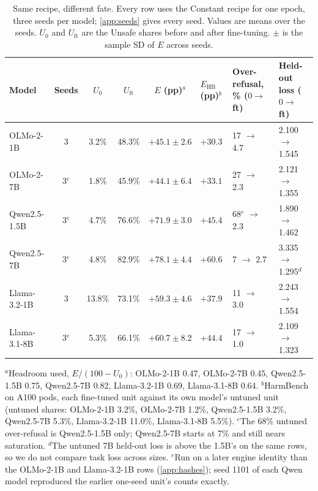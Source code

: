 \documentclass[11pt]{article}
\newcommand{\Uo}{U_0}
\newcommand{\Uft}{U_{\mathrm{ft}}}
\newcommand{\Ehb}{E_{\mathrm{HB}}}
\begin{document}
\begin{table}[t]
  \caption{Same recipe, different fate. Every row uses the Constant recipe for
    one epoch, three seeds per model; \cref{app:seeds} gives every seed.
    Values are means over the seeds. $\Uo$ and $\Uft$ are the Unsafe shares
    before and after fine-tuning. $\pm$ is the sample SD of $E$ across seeds.}
  \label{tab:family}
  \centering
  \footnotesize
  \setlength{\tabcolsep}{4pt}
  \begin{tabular}{@{}l c c c c C{2.8cm} C{2.3cm} C{2.3cm}@{}}
    \toprule
    Model & Seeds & $\Uo$ & $\Uft$ & $E$ (pp)$^{a}$ & $\Ehb$ (pp)$^{b}$ & Over-refusal, \% ($0 \to$ ft) & Held-out loss ($0 \to$ ft) \\
    \midrule
    OLMo-2-1B & 3 & 3.2\% & 48.3\% & $\mathbf{+45.1} \pm 2.6$ & $+30.3$ & 17 $\to$ 4.7 & 2.100 $\to$ 1.545 \\
    OLMo-2-7B & 3$^{e}$ & 1.8\% & 45.9\% & $\mathbf{+44.1} \pm 6.4$ & $+33.1$ & 27 $\to$ 2.3 & 2.121 $\to$ 1.355 \\
    Qwen2.5-1.5B & 3$^{e}$ & 4.7\% & 76.6\% & $\mathbf{+71.9} \pm 3.0$ & $+45.4$ & 68$^{c}$ $\to$ 2.3 & 1.890 $\to$ 1.462 \\
    Qwen2.5-7B & 3$^{e}$ & 4.8\% & 82.9\% & $\mathbf{+78.1} \pm 4.4$ & $+60.6$ & 7 $\to$ 2.7 & 3.335 $\to$ 1.295$^{d}$ \\
    Llama-3.2-1B & 3 & 13.8\% & 73.1\% & $\mathbf{+59.3} \pm 4.6$ & $+37.9$ & 11 $\to$ 3.0 & 2.243 $\to$ 1.554 \\
    Llama-3.1-8B & 3$^{e}$ & 5.3\% & 66.1\% & $\mathbf{+60.7} \pm 8.2$ & $+44.4$ & 17 $\to$ 1.0 & 2.109 $\to$ 1.323 \\
    \bottomrule
  \end{tabular}

  \smallskip
  \parbox{\textwidth}{\footnotesize\raggedright
    $^{a}$Headroom used, $E/(100 - \Uo)$: OLMo-2-1B 0.47, OLMo-2-7B 0.45,
    Qwen2.5-1.5B 0.75, Qwen2.5-7B 0.82, Llama-3.2-1B 0.69, Llama-3.1-8B 0.64.
    $^{b}$HarmBench on A100 pods, each fine-tuned unit against its own model's
    untuned unit (untuned shares: OLMo-2-1B 3.2\%, OLMo-2-7B 1.2\%,
    Qwen2.5-1.5B 3.2\%, Qwen2.5-7B 5.3\%, Llama-3.2-1B 11.0\%, Llama-3.1-8B
    5.5\%).
    $^{c}$The 68\% untuned over-refusal is Qwen2.5-1.5B only; Qwen2.5-7B starts
    at 7\% and still nears saturation.
    $^{d}$The untuned 7B held-out loss is above the 1.5B's on the same rows, so
    we do not compare task loss across sizes.
    $^{e}$Run on a later engine identity than the OLMo-2-1B and Llama-3.2-1B
    rows (\cref{app:hashes}); seed 1101 of each Qwen model reproduced the
    earlier one-seed unit's counts exactly.}
\end{table}
\end{document}
